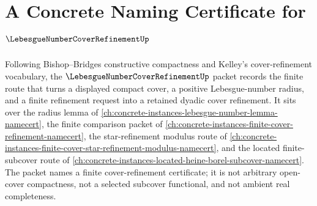 \chapter{A Concrete Naming Certificate for $\LebesgueNumberCoverRefinementUp$}
\label{ch:concrete-instances-lebesgue-number-cover-refinement-namecert}

Following Bishop--Bridges constructive compactness and Kelley's cover-refinement vocabulary, the $\LebesgueNumberCoverRefinementUp$ packet records the finite route that turns a displayed compact cover, a positive Lebesgue-number radius, and a finite refinement request into a retained dyadic cover refinement. It sits over the radius lemma of \autoref{ch:concrete-instances-lebesgue-number-lemma-namecert}, the finite comparison packet of \autoref{ch:concrete-instances-finite-cover-refinement-namecert}, the star-refinement modulus route of \autoref{ch:concrete-instances-finite-cover-star-refinement-modulus-namecert}, and the located finite-subcover route of \autoref{ch:concrete-instances-located-heine-borel-subcover-namecert}. The packet names a finite cover-refinement certificate; it is not arbitrary open-cover compactness, not a selected subcover functional, and not ambient real completeness.

